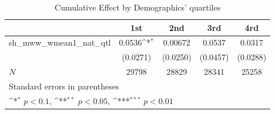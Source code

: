 \begin{table}[htbp]\centering
\def\sym#1{\ifmmode^{#1}\else\(^{#1}\)\fi}
\caption{Cumulative Effect by Demographics' quartiles}
\begin{tabular}{l*{4}{c}}
\hline\hline
            &\multicolumn{1}{c}{1st}&\multicolumn{1}{c}{2nd}&\multicolumn{1}{c}{3rd}&\multicolumn{1}{c}{4rd}\\
\hline
sh\_mww\_wmean1\_nat\_qtl&      0.0536\sym{*}  &     0.00672         &      0.0537         &      0.0317         \\
            &    (0.0271)         &    (0.0250)         &    (0.0457)         &    (0.0288)         \\
\hline
\(N\)       &       29798         &       28829         &       28341         &       25258         \\
\hline\hline
\multicolumn{5}{l}{\footnotesize Standard errors in parentheses}\\
\multicolumn{5}{l}{\footnotesize \sym{*} \(p<0.1\), \sym{**} \(p<0.05\), \sym{***} \(p<0.01\)}\\
\end{tabular}
\end{table}
